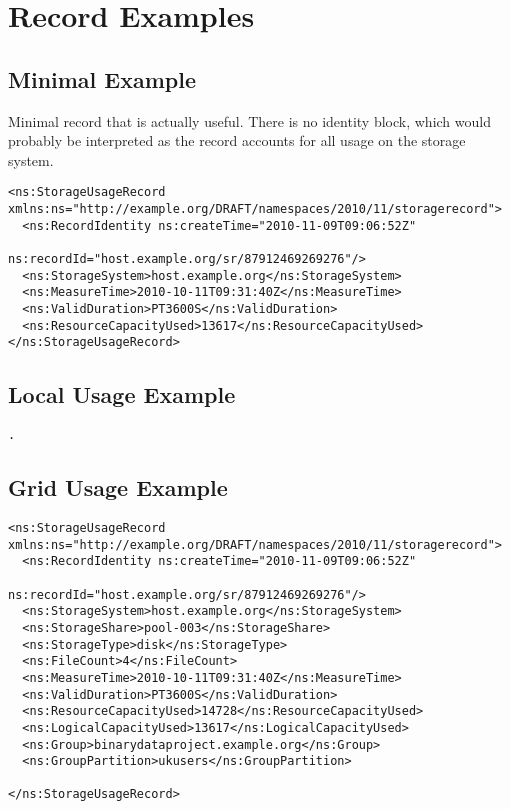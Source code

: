 
\section{Record Examples}
\label{sec:record-examples}


\subsection{Minimal Example}

Minimal record that is actually useful. There is no identity block, which would
probably be interpreted as the record accounts for all usage on the storage
system.

\begin{verbatim}
<ns:StorageUsageRecord xmlns:ns="http://example.org/DRAFT/namespaces/2010/11/storagerecord">
  <ns:RecordIdentity ns:createTime="2010-11-09T09:06:52Z"
                     ns:recordId="host.example.org/sr/87912469269276"/>
  <ns:StorageSystem>host.example.org</ns:StorageSystem>
  <ns:MeasureTime>2010-10-11T09:31:40Z</ns:MeasureTime>
  <ns:ValidDuration>PT3600S</ns:ValidDuration>
  <ns:ResourceCapacityUsed>13617</ns:ResourceCapacityUsed>
</ns:StorageUsageRecord>
\end{verbatim}


\subsection{Local Usage Example}


\begin{verbatim}
.
\end{verbatim}



\subsection{Grid Usage Example}

\begin{verbatim}
<ns:StorageUsageRecord xmlns:ns="http://example.org/DRAFT/namespaces/2010/11/storagerecord">
  <ns:RecordIdentity ns:createTime="2010-11-09T09:06:52Z"
                     ns:recordId="host.example.org/sr/87912469269276"/>
  <ns:StorageSystem>host.example.org</ns:StorageSystem>
  <ns:StorageShare>pool-003</ns:StorageShare>
  <ns:StorageType>disk</ns:StorageType>
  <ns:FileCount>4</ns:FileCount>
  <ns:MeasureTime>2010-10-11T09:31:40Z</ns:MeasureTime>
  <ns:ValidDuration>PT3600S</ns:ValidDuration>
  <ns:ResourceCapacityUsed>14728</ns:ResourceCapacityUsed>
  <ns:LogicalCapacityUsed>13617</ns:LogicalCapacityUsed>
  <ns:Group>binarydataproject.example.org</ns:Group>
  <ns:GroupPartition>ukusers</ns:GroupPartition>

</ns:StorageUsageRecord>

\end{verbatim}


